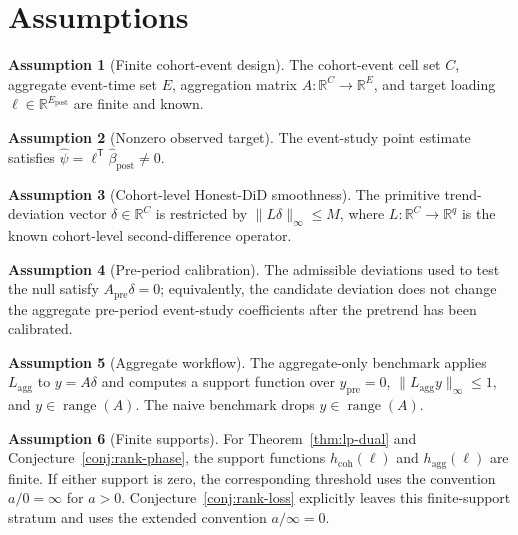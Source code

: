 \documentclass[11pt]{article}
\newcommand{\transpose}{\mathsf{T}}
\newcommand{\R}{\mathbb{R}}
\theoremstyle{definition}
\newtheorem{assumption}{Assumption}
\theoremstyle{plain}
\theoremstyle{remark}
\begin{document}
\section{Assumptions}
\begin{assumption}[Finite cohort-event design]\label{ass:finite-design}
The cohort-event cell set \(C\), aggregate event-time set \(E\), aggregation matrix \(A:\R^C\to\R^E\), and target loading \(\ell\in\R^{E_{\mathrm{post}}}\) are finite and known.
\end{assumption}

\begin{assumption}[Nonzero observed target]\label{ass:nonzero-target}
The event-study point estimate satisfies \(\hat\psi=\ell^\transpose\hat\beta_{\mathrm{post}}\ne0\).
\end{assumption}

\begin{assumption}[Cohort-level Honest-DiD smoothness]\label{ass:cohort-smoothness}
The primitive trend-deviation vector \(\delta\in\R^C\) is restricted by \(\|L\delta\|_\infty\le M\), where \(L:\R^C\to\R^q\) is the known cohort-level second-difference operator.
\end{assumption}

\begin{assumption}[Pre-period calibration]\label{ass:pre-calibration}
The admissible deviations used to test the null satisfy \(A_{\mathrm{pre}}\delta=0\); equivalently, the candidate deviation does not change the aggregate pre-period event-study coefficients after the pretrend has been calibrated.
\end{assumption}

\begin{assumption}[Aggregate workflow]\label{ass:aggregate-workflow}
The aggregate-only benchmark applies \(L_{\mathrm{agg}}\) to \(y=A\delta\) and computes a support function over \(y_{\mathrm{pre}}=0\), \(\|L_{\mathrm{agg}}y\|_\infty\le1\), and \(y\in\operatorname{range}(A)\).  The naive benchmark drops \(y\in\operatorname{range}(A)\).
\end{assumption}

\begin{assumption}[Finite supports]\label{ass:finite-supports}
For Theorem~\ref{thm:lp-dual} and Conjecture~\ref{conj:rank-phase}, the support functions \(h_{\mathrm{coh}}(\ell)\) and \(h_{\mathrm{agg}}(\ell)\) are finite.  If either support is zero, the corresponding threshold uses the convention \(a/0=\infty\) for \(a>0\).  Conjecture~\ref{conj:rank-loss} explicitly leaves this finite-support stratum and uses the extended convention \(a/\infty=0\).
\end{assumption}
\end{document}
